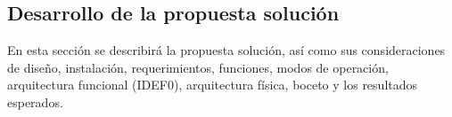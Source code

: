 





\subsection{Desarrollo de la propuesta solución}
En esta sección se describirá la propuesta solución, así como sus consideraciones de diseño, instalación, requerimientos, funciones, modos de operación, arquitectura funcional (IDEF0), arquitectura física, boceto y los resultados esperados.
    
    
    
    
    
    
    
    
    


